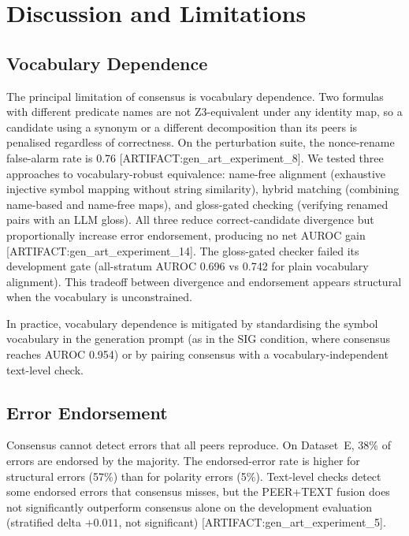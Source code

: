 \documentclass[11pt,letterpaper]{article}
\begin{document}
\section{Discussion and Limitations}
\label{sec:discussion}

\subsection{Vocabulary Dependence}
\label{sec:vocab_dep}

The principal limitation of consensus is vocabulary dependence.
Two formulas with different predicate names are not Z3-equivalent under any identity map, so a candidate using a synonym or a different decomposition than its peers is penalised regardless of correctness.
On the perturbation suite, the nonce-rename false-alarm rate is 0.76 [ARTIFACT:gen\_art\_experiment\_8].
We tested three approaches to vocabulary-robust equivalence: name-free alignment (exhaustive injective symbol mapping without string similarity), hybrid matching (combining name-based and name-free maps), and gloss-gated checking (verifying renamed pairs with an LLM gloss).
All three reduce correct-candidate divergence but proportionally increase error endorsement, producing no net AUROC gain [ARTIFACT:gen\_art\_experiment\_14].
The gloss-gated checker failed its development gate (all-stratum AUROC 0.696 vs 0.742 for plain vocabulary alignment).
This tradeoff between divergence and endorsement appears structural when the vocabulary is unconstrained.

In practice, vocabulary dependence is mitigated by standardising the symbol vocabulary in the generation prompt (as in the SIG condition, where consensus reaches AUROC 0.954) or by pairing consensus with a vocabulary-independent text-level check.

\subsection{Error Endorsement}
\label{sec:endorsement}

Consensus cannot detect errors that all peers reproduce.
On Dataset~E, 38\% of errors are endorsed by the majority.
The endorsed-error rate is higher for structural errors (57\%) than for polarity errors (5\%).
Text-level checks detect some endorsed errors that consensus misses, but the PEER+TEXT fusion does not significantly outperform consensus alone on the development evaluation (stratified delta $+0.011$, not significant) [ARTIFACT:gen\_art\_experiment\_5].
\end{document}
